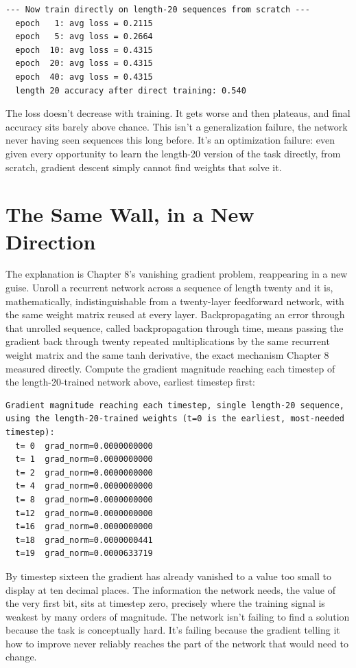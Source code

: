 \begin{Verbatim}[fontsize=\small, frame=single, xleftmargin=1em, xrightmargin=1em]
--- Now train directly on length-20 sequences from scratch ---
  epoch   1: avg loss = 0.2115
  epoch   5: avg loss = 0.2664
  epoch  10: avg loss = 0.4315
  epoch  20: avg loss = 0.4315
  epoch  40: avg loss = 0.4315
  length 20 accuracy after direct training: 0.540
\end{Verbatim}

The loss doesn't decrease with training. It gets worse and then plateaus, and final accuracy sits barely above chance. This isn't a generalization failure, the network never having seen sequences this long before. It's an optimization failure: even given every opportunity to learn the length-20 version of the task directly, from scratch, gradient descent simply cannot find weights that solve it.

\section*{The Same Wall, in a New Direction}

The explanation is Chapter 8's vanishing gradient problem, reappearing in a new guise. Unroll a recurrent network across a sequence of length twenty and it is, mathematically, indistinguishable from a twenty-layer feedforward network, with the same weight matrix reused at every layer. Backpropagating an error through that unrolled sequence, called backpropagation through time, means passing the gradient back through twenty repeated multiplications by the same recurrent weight matrix and the same tanh derivative, the exact mechanism Chapter 8 measured directly. Compute the gradient magnitude reaching each timestep of the length-20-trained network above, earliest timestep first:

\begin{Verbatim}[fontsize=\small, frame=single, xleftmargin=1em, xrightmargin=1em]
Gradient magnitude reaching each timestep, single length-20 sequence,
using the length-20-trained weights (t=0 is the earliest, most-needed timestep):
  t= 0  grad_norm=0.0000000000
  t= 1  grad_norm=0.0000000000
  t= 2  grad_norm=0.0000000000
  t= 4  grad_norm=0.0000000000
  t= 8  grad_norm=0.0000000000
  t=12  grad_norm=0.0000000000
  t=16  grad_norm=0.0000000000
  t=18  grad_norm=0.0000000441
  t=19  grad_norm=0.0000633719
\end{Verbatim}

By timestep sixteen the gradient has already vanished to a value too small to display at ten decimal places. The information the network needs, the value of the very first bit, sits at timestep zero, precisely where the training signal is weakest by many orders of magnitude. The network isn't failing to find a solution because the task is conceptually hard. It's failing because the gradient telling it how to improve never reliably reaches the part of the network that would need to change.


